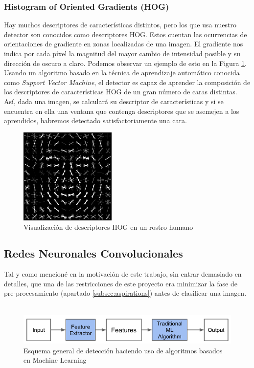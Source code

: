 \documentclass[a4paper,11pt]{book}
\begin{document}
\subsubsection{Histogram of Oriented Gradients (HOG)}
Hay muchos descriptores de características distintos, pero los que usa nuestro detector son conocidos como descriptores HOG. Estos cuentan las ocurrencias de orientaciones de gradiente en zonas localizadas de una imagen. El gradiente nos indica por cada píxel la magnitud del mayor cambio de intensidad posible y su dirección de oscuro a claro. Podemos observar un ejemplo de esto en la Figura \ref{fig:hog01}.\\
Usando un algoritmo\cite{king15} basado en la técnica de aprendizaje automático conocida como \textit{Support Vector Machine}\cite{cortes_vapnik95}, el detector es capaz de aprender la composición de los descriptores de características HOG de un gran número de caras distintas.\\
Así, dada una imagen, se calculará su descriptor de características y si se encuentra en ella una ventana que contenga descriptores que se asemejen a los aprendidos, habremos detectado satisfactoriamente una cara.
\begin{figure}[h]
	\centering
	\includegraphics[width=0.3\linewidth]{imagenes/hog01}
	\caption[Descriptores HOG]{Visualización de descriptores HOG en un rostro humano \cite{king14}}
	\label{fig:hog01}
\end{figure}

\subsection{Redes Neuronales Convolucionales}\label{sub:cnns}
Tal y como mencioné en la motivación de este trabajo, sin entrar demasiado en detalles, que una de las restricciones de este proyecto era minimizar la fase de pre-procesamiento (apartado \ref{subsec:aspirations}) antes de clasificar una imagen.\\ \\
\begin{figure}[h]
\centering
\includegraphics[width=0.7\linewidth]{imagenes/machine_learning_flow}
\caption[Machine Learning]{Esquema general de detección haciendo uso de algoritmos basados en Machine Learning \cite{moujahid16} }
\label{fig:machine_learning_flow}
\end{figure}
\\
\end{document}
